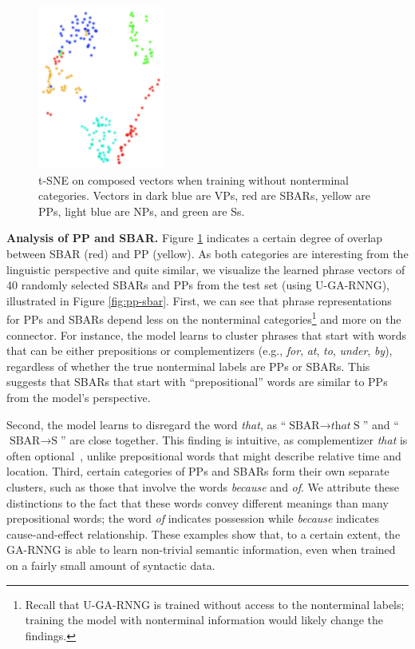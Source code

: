 \documentclass[11pt]{article}
\begin{document}
\begin{figure}[h]
\centering
\includegraphics[width=0.37\textwidth,angle=90]{t-sne-terms-colors.pdf}
\caption{t-SNE on composed vectors when training without nonterminal categories. Vectors in dark blue are VPs, red are SBARs, yellow are PPs, light blue are NPs, and green are Ss. 
\label{fig:nt-cluster}}
\end{figure}

\textbf{Analysis of PP and SBAR.} Figure \ref{fig:nt-cluster} indicates a certain degree of overlap between SBAR (red) and PP (yellow). As both categories are interesting from the linguistic perspective and quite similar, we visualize the learned phrase vectors of 40 randomly selected SBARs and PPs from the test set (using U-GA-RNNG), illustrated in Figure \ref{fig:pp-sbar}. First, we can see that phrase representations for PPs and SBARs depend less on the nonterminal categories\footnote{Recall that U-GA-RNNG is trained without access to the nonterminal labels; training the model with nonterminal information would likely change the findings.} and more on the connector. For instance, the model learns to cluster phrases that start with words that can be either prepositions or complementizers (e.g., \emph{for}, \emph{at}, \emph{to}, \emph{under}, \emph{by}), regardless of whether the true nonterminal labels are PPs or SBARs. This suggests that SBARs that start with ``prepositional'' words are similar to PPs from the model's perspective.

Second, the model learns to disregard the word \emph{that}, as ``$\text{SBAR} \rightarrow \textit{that}\ \text{S}$'' and ``$\text{SBAR} \rightarrow \text{S}$'' are close together. This finding is intuitive, as complementizer \emph{that} is often optional~\cite{jaeger:2010}, unlike prepositional words that might describe relative time and location. Third, certain categories of PPs and SBARs form their own separate clusters, such as those that involve the words \emph{because} and \emph{of}. We attribute these distinctions to the fact that these words convey different meanings than many prepositional words; the word \emph{of} indicates possession while \emph{because} indicates cause-and-effect relationship. These examples show that, to a certain extent, the GA-RNNG is able to learn non-trivial semantic information, even when trained on a fairly small amount of syntactic data.
\end{document}
